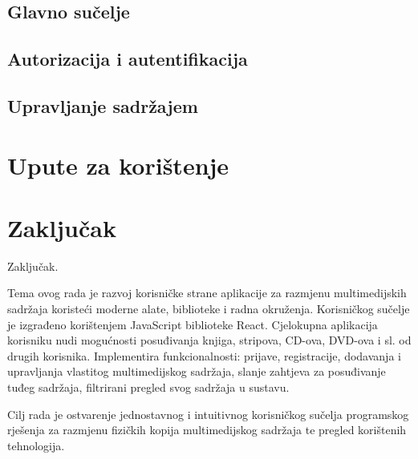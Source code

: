 \documentclass[times, utf8, zavrsni, numeric]{fer}
\begin{document}
\clearpage


\section{Glavno sučelje}

\section{Autorizacija i autentifikacija}

\section{Upravljanje sadržajem}


\chapter{Upute za korištenje}


\chapter{Zaključak}
Zaključak.





\begin{sazetak}
Tema ovog rada je razvoj korisničke strane aplikacije za razmjenu multimedijskih sadržaja koristeći moderne alate, biblioteke i radna okruženja.
Korisničkog sučelje je izgrađeno korištenjem JavaScript biblioteke React.
Cjelokupna aplikacija korisniku nudi mogućnosti posuđivanja knjiga, stripova, CD-ova, DVD-ova i sl. od drugih korisnika.
Implementira funkcionalnosti: prijave, registracije, dodavanja i upravljanja vlastitog multimedijskog sadržaja, slanje zahtjeva za posuđivanje tuđeg sadržaja, filtrirani pregled svog sadržaja u sustavu.

Cilj rada je ostvarenje jednostavnog i intuitivnog korisničkog sučelja programskog rješenja za razmjenu fizičkih kopija multimedijskog sadržaja te pregled korištenih tehnologija.

\end{sazetak}
\end{document}
